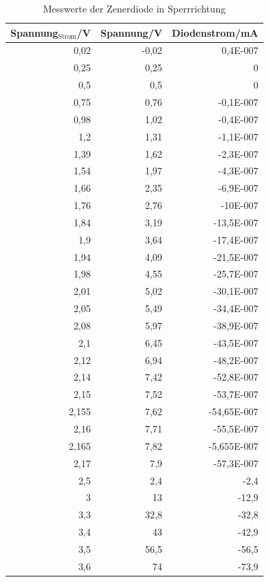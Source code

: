 \documentclass[12pt,a4paper]{article}
\begin{document}
\begin{table}[H]
\caption{Messwerte der Zenerdiode in Sperrrichtung}
\begin{center}
\begin{tabular}{|r|r|r|}
\hline
\multicolumn{1}{|l|}{Spannung$_\text{Strom}$/V} & \multicolumn{1}{l|}{Spannung/V} & \multicolumn{1}{l|}{Diodenstrom/mA} \\ \hline
0,02 & -0,02 & 0,4E-007 \\ \hline
0,25 & 0,25 & 0 \\ \hline
0,5 & 0,5 & 0 \\ \hline
0,75 & 0,76 & -0,1E-007 \\ \hline
0,98 & 1,02 & -0,4E-007 \\ \hline
1,2 & 1,31 & -1,1E-007 \\ \hline
1,39 & 1,62 & -2,3E-007 \\ \hline
1,54 & 1,97 & -4,3E-007 \\ \hline
1,66 & 2,35 & -6,9E-007 \\ \hline
1,76 & 2,76 & -10E-007 \\ \hline
1,84 & 3,19 & -13,5E-007 \\ \hline
1,9 & 3,64 & -17,4E-007 \\ \hline
1,94 & 4,09 & -21,5E-007 \\ \hline
1,98 & 4,55 & -25,7E-007 \\ \hline
2,01 & 5,02 & -30,1E-007 \\ \hline
2,05 & 5,49 & -34,4E-007 \\ \hline
2,08 & 5,97 & -38,9E-007 \\ \hline
2,1 & 6,45 & -43,5E-007 \\ \hline
2,12 & 6,94 & -48,2E-007 \\ \hline
2,14 & 7,42 & -52,8E-007 \\ \hline
2,15 & 7,52 & -53,7E-007 \\ \hline
2,155 & 7,62 & -54,65E-007 \\ \hline
2,16 & 7,71 & -55,5E-007 \\ \hline
2,165 & 7,82 & -5,655E-007 \\ \hline
2,17 & 7,9 & -57,3E-007 \\ \hline
2,5 & 2,4 & -2,4 \\ \hline
3 & 13 & -12,9 \\ \hline
3,3 & 32,8 & -32,8 \\ \hline
3,4 & 43 & -42,9 \\ \hline
3,5 & 56,5 & -56,5 \\ \hline
3,6 & 74 & -73,9 \\ \hline

\end{tabular}
\end{center}
\end{table}
\end{document}
